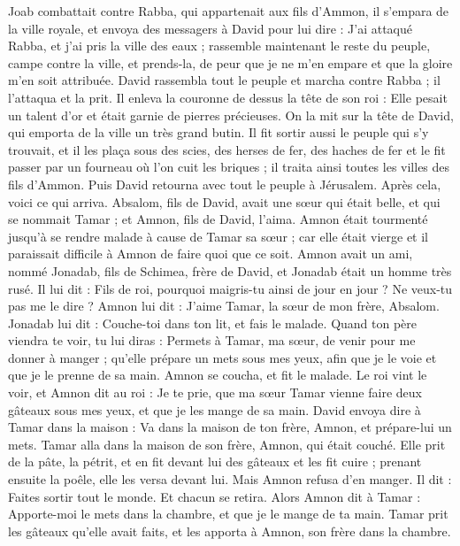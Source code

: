 \begin{multicols}{2}
Joab combattait contre Rabba, qui appartenait aux fils d’Ammon, il s’empara de la ville royale,
et envoya des messagers à David pour lui dire : J'ai attaqué Rabba, et j'ai pris la ville des eaux ;
rassemble maintenant le reste du peuple, campe contre la ville, et prends-la, de peur que je ne m’en empare et que la gloire m’en soit attribuée.
David rassembla tout le peuple et marcha contre Rabba ; il l’attaqua et la prit.
Il enleva la couronne de dessus la tête de son roi : Elle pesait un talent d'or et était garnie de pierres précieuses. On la mit sur la tête de David, qui emporta de la ville un très grand butin.
Il fit sortir aussi le peuple qui s’y trouvait, et il les plaça sous des scies, des herses de fer, des haches de fer et le fit passer par un fourneau où l'on cuit les briques ; il traita ainsi toutes les villes des fils d’Ammon. Puis David retourna avec tout le peuple à Jérusalem.
\VerseOne{}Après cela, voici ce qui arriva. Absalom, fils de David, avait une sœur qui était belle, et qui se nommait Tamar ; et Amnon, fils de David, l'aima.
Amnon était tourmenté jusqu’à se rendre malade à cause de Tamar sa sœur ; car elle était vierge et il paraissait difficile à Amnon de faire quoi que ce soit.
Amnon avait un ami, nommé Jonadab, fils de Schimea, frère de David, et Jonadab était un homme très rusé.
Il lui dit : Fils de roi, pourquoi maigris-tu ainsi de jour en jour ? Ne veux-tu pas me le dire ? Amnon lui dit : J'aime Tamar, la sœur de mon frère, Absalom.
Jonadab lui dit : Couche-toi dans ton lit, et fais le malade. Quand ton père viendra te voir, tu lui diras : Permets à Tamar, ma sœur, de venir pour me donner à manger ; qu’elle prépare un mets sous mes yeux, afin que je le voie et que je le prenne de sa main.
Amnon se coucha, et fit le malade. Le roi vint le voir, et Amnon dit au roi : Je te prie, que ma sœur Tamar vienne faire deux gâteaux sous mes yeux, et que je les mange de sa main.
David envoya dire à Tamar dans la maison : Va dans la maison de ton frère, Amnon, et prépare-lui un mets.
Tamar alla dans la maison de son frère, Amnon, qui était couché. Elle prit de la pâte, la pétrit, et en fit devant lui des gâteaux et les fit cuire ;
prenant ensuite la poêle, elle les versa devant lui. Mais Amnon refusa d'en manger. Il dit : Faites sortir tout le monde. Et chacun se retira.
Alors Amnon dit à Tamar : Apporte-moi le mets dans la chambre, et que je le mange de ta main. Tamar prit les gâteaux qu'elle avait faits, et les apporta à Amnon, son frère dans la chambre.

\end{multicols}
